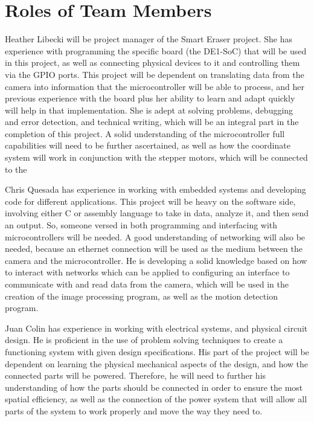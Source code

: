 \pagebreak

\section{Roles of Team Members}
 Heather Libecki will be project manager of the Smart Eraser project. She has experience with programming the specific board (the DE1-SoC) that will be used in this project, as well as connecting physical devices to it and controlling them via the GPIO ports. This project will be dependent on translating data from the camera into information that the microcontroller will be able to process, and her previous experience with the board plus her ability to learn and adapt quickly will help in that implementation. She is adept at solving problems, debugging and error detection, and technical writing, which will be an integral part in the completion of this project. A solid understanding of the microcontroller full capabilities will need to be further ascertained, as well as how the coordinate system will work in conjunction with the stepper motors, which will be connected to the\par
 \setlength{\parindent}{5ex}
 Chris Quesada has experience in working with embedded systems and developing code for different applications. This project will be heavy on the software side, involving either C or assembly language to take in data, analyze it, and then send an output. So, someone versed in both programming and interfacing with microcontrollers will be needed. A good understanding of networking will also be needed, because an ethernet connection will be used as the medium between the camera and the microcontroller. He is developing a solid knowledge based on how to interact with networks which can be applied to configuring an interface to communicate with and read data from the camera, which will be used in the creation of the image processing program, as well as the motion detection program.\par
 \setlength{\parindent}{5ex}
 Juan Colin has experience in working with electrical systems, and physical circuit design. He is proficient in the use of problem solving techniques to create a functioning system with given design specifications. His part of the project will be dependent on learning the physical mechanical aspects of the design, and how the connected parts will be powered. Therefore, he will need to further his understanding of how the parts should be connected in order to ensure the most spatial efficiency, as well as the connection of the power system that will allow all parts of the system to work properly and move the way they need to.
 

